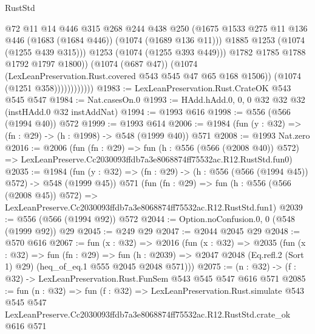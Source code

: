 \begin{lexlean}{RustStd}
\begin{coremodule}
                                @72
                                @11
                                @14
                                @446
                                @315
                                @268
                                @244
                                @438
                                @250
                                (@1675
                                  @1533
                                  @275
                                  @11
                                  @136
                                  @446
                                  (@1683 (@1684 @446))
                                  (@1074 (@1689 @136 @11)))
                                @1885
                                @1253
                                (@1074 (@1255 @439 @315)))
                              @1253
                              (@1074 (@1255 @393 @449)))
                            @1782
                            @1785
                            @1788
                            @1792
                            @1797
                            @1800))
                        (@1074 (@687 @47))
                        (@1074 (LexLeanPreservation.Rust.covered @543 @545 @47 @65 @168 @1506))
                        (@1074 (@1251 @358))))))))))))
@1983 := LexLeanPreservation.Rust.CrateOK @543 @545 @547
@1984 := Nat.casesOn.{0}
@1993 := HAdd.hAdd.{0, 0, 0} @32 @32 @32 (instHAdd.{0} @32 instAddNat)
@1994 := @1993 @616
@1998 := @556 (@566 (@1994 @40)) @572
@1999 := @1993 @614
@2006 := @1984 (fun (y : @32) => (fn : @29) -> (h : @1998) -> @548 (@1999 @40)) @571
@2008 := @1993 Nat.zero
@2016 := @2006
    (fun (fn : @29) =>
    fun (h : @556 (@566 (@2008 @40)) @572) =>
    LexLeanPreserve.Cc2030093ffdb7a3e8068874ff75532ac.R12.RustStd.fun0)
@2035 := @1984
    (fun (y : @32) => (fn : @29) -> (h : @556 (@566 (@1994 @45)) @572) -> @548 (@1999 @45))
    @571
    (fun (fn : @29) =>
    fun (h : @556 (@566 (@2008 @45)) @572) =>
    LexLeanPreserve.Cc2030093ffdb7a3e8068874ff75532ac.R12.RustStd.fun1)
@2039 := @556 (@566 (@1994 @92)) @572
@2044 := Option.noConfusion.{0, 0} (@548 (@1999 @92)) @29
@2045 := @249 @29
@2047 := @2044 @2045 @29
@2048 := @570 @616
@2067 := fun (x : @32) =>
  @2016
    (fun (x : @32) =>
    @2035
      (fun (x : @32) =>
      fun (fn : @29) =>
      fun (h : @2039) =>
      @2047 @2048 (Eq.refl.{2} (Sort 1) @29) (heq_of_eq.{1} @555 @2045 @2048 @571)))
@2075 := (n : @32) -> (f : @32) -> LexLeanPreservation.Rust.FunSem @543 @545 @547 @616 @571
@2085 := fun (n : @32) =>
  fun (f : @32) =>
  LexLeanPreservation.Rust.simulate
    @543
    @545
    @547
    LexLeanPreserve.Cc2030093ffdb7a3e8068874ff75532ac.R12.RustStd.crate_ok
    @616
    @571
\end{coremodule}
\end{lexlean}
